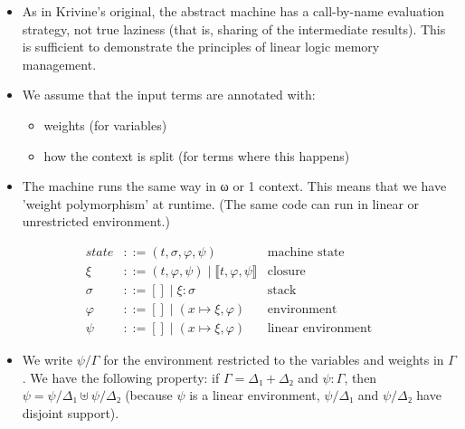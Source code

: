 \documentclass[11pt]{article}
\newcommand{\susp}[1]{⟦#1⟧}
\begin{document}
\begin{itemize}
\item As in Krivine's original, the abstract machine has a call-by-name
evaluation strategy, not true laziness (that is, sharing of the
intermediate results). This is sufficient to demonstrate the
principles of linear logic memory management.

\item We assume that the input terms are annotated with:
\begin{itemize}
\item weights (for variables)
\item how the context is split (for terms where this happens)
\end{itemize}

\item The machine runs the same way in ω or 1 context. This means that we
have 'weight polymorphism' at runtime. (The same code can run in
linear or unrestricted environment.)
\end{itemize}

\begin{align*}
state       &::= (t,σ,φ,ψ) & \text{machine state} \\
ξ     &::= (t,φ,ψ) \mid \susp{t,φ,ψ} & \text{closure} \\
σ       &::= [] \mid ξ:σ & \text{stack} \\
φ &::= [] \mid (x↦ξ,φ) & \text{environment} \\
ψ &::= [] \mid (x↦ξ,φ) & \text{linear environment}
\end{align*}

\begin{itemize}
\item We write \(ψ/Γ\) for the environment restricted to the variables and
weights in \(Γ\). We have the following property: if \(Γ = Δ₁+Δ₂\) and
\(ψ : Γ\), then \(ψ = ψ/Δ₁ ⊎ ψ/Δ₂\) (because \(ψ\) is a linear
environment, \(ψ/Δ₁\) and \(ψ/Δ₂\) have disjoint support).
\end{itemize}
\end{document}
